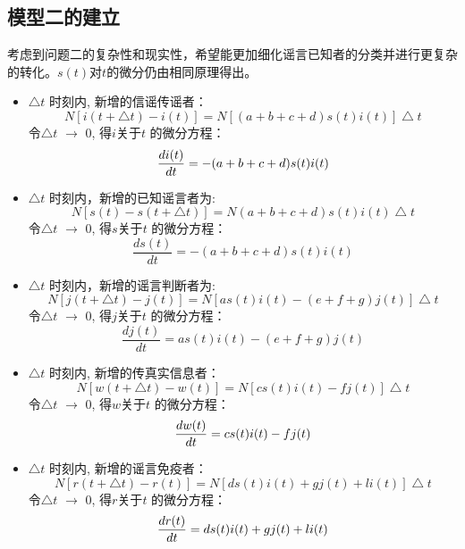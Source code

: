 \documentclass[withoutpreface,bwprint]{cumcmthesis}
\begin{document}
\subsection{模型二的建立}
考虑到问题二的复杂性和现实性，希望能更加细化谣言已知者的分类并进行更复杂的转化。$s(t)$对$t$的微分仍由相同原理得出。
\begin{itemize}
	\item $\bigtriangleup t$ 时刻内, 新增的信谣传谣者：
	\[
	N[i(t+\bigtriangleup t)-i(t)]=N[(a+b+c+d)s(t)i(t)]\bigtriangleup t
	\]
	令$\bigtriangleup t$ $\longrightarrow$ 0, 得$i$关于$t$ 的微分方程：
	\[
	\frac{di(t)}{dt} = -(a+b+c+d)s(t)i(t)\\
	\]
	\item $\bigtriangleup t$ 时刻内，新增的已知谣言者为:
	\[
	N[s(t)-s(t+\bigtriangleup t)]= N(a+b+c+d)s(t)i(t)\bigtriangleup t
	\]
	令$\bigtriangleup t$ $\longrightarrow$ 0, 得$s$关于$t$ 的微分方程：
	\[
	\frac{ds(t)}{dt} = -(a+b+c+d)s(t)i(t)
	\]
	\item $\bigtriangleup t$ 时刻内，新增的谣言判断者为:
	\[
	N[j(t+\bigtriangleup t)-j(t)]= N[as(t)i(t)-(e+f+g)j(t)]\bigtriangleup t
	\]
	令$\bigtriangleup t$ $\longrightarrow$ 0, 得$j$关于$t$ 的微分方程：
	\[
	\frac{dj(t)}{dt} = as(t)i(t)-(e+f+g)j(t)
	\]
	\item $\bigtriangleup t$ 时刻内, 新增的传真实信息者：
	\[
	N[w(t+\bigtriangleup t)-w(t)]=N[cs(t)i(t)-fj(t)]\bigtriangleup t
	\]
	令$\bigtriangleup t$ $\longrightarrow$ 0, 得$w$关于$t$ 的微分方程：
	\[
	\frac{dw(t)}{dt} = cs(t)i(t)-fj(t)\\
	\]
	\item $\bigtriangleup t$ 时刻内, 新增的谣言免疫者：
	\[
	N[r(t+\bigtriangleup t)-r(t)]=N[ds(t)i(t) + gj(t) + li(t)]\bigtriangleup t
	\]
	令$\bigtriangleup t$ $\longrightarrow$ 0, 得$r$关于$t$ 的微分方程：
	\[
	\frac{dr(t)}{dt} = ds(t)i(t) + gj(t) + li(t)\\
	\]
	
\end{itemize}
\end{document}
